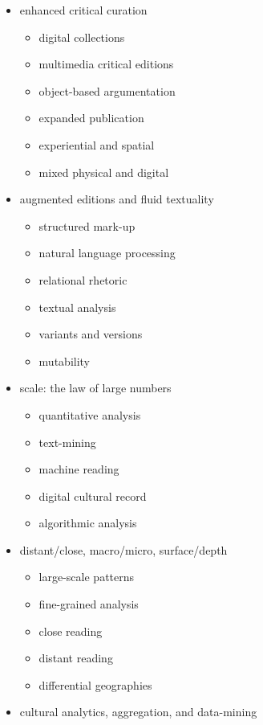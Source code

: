 \begin{multicols}{2}\raggedright
\begin{itemize}
  \item enhanced critical curation
  \begin{itemize}
    \item digital collections
    \item multimedia critical editions
    \item object-based argumentation
    \item expanded publication
    \item experiential and spatial
    \item mixed physical and digital
  \end{itemize}
  \item augmented editions and fluid textuality
  \begin{itemize}
    \item structured mark-up
    \item	natural language processing
    \item	relational rhetoric
    \item	textual analysis
    \item	variants and versions
    \item	mutability
  \end{itemize}
  \item scale: the law of large numbers
  \begin{itemize}
    \item quantitative analysis
    \item	text-mining
    \item	machine reading
    \item	digital cultural record
    \item	algorithmic analysis
  \end{itemize}
  \item distant/close, macro/micro, surface/depth
  \begin{itemize}
    \item large-scale patterns
    \item	fine-grained analysis
    \item	close reading
    \item	distant reading
    \item	differential geographies
  \end{itemize}
  \item cultural analytics, aggregation, and data-mining
  \begin{itemize}

\end{itemize}
\end{itemize}
\end{multicols}
